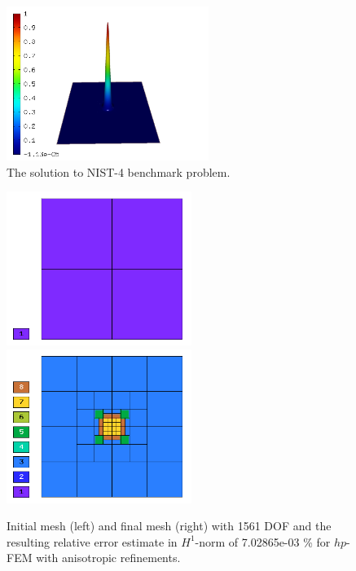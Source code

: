 \documentclass[12pt]{elsarticle}
\begin{document}
\begin{figure}[!ht]
\centering
\includegraphics[height=5cm]{nist/nist-4/solution.png}
\caption{The solution to NIST-4 benchmark problem.}
\label{fig:sln-nist04}
\end{figure}

\begin{figure}[!ht]
\centering
\includegraphics[height=5cm]{nist/nist-4/mesh_hp_aniso_init.png}\ \
\includegraphics[height=5cm]{nist/nist-4/mesh_hp_aniso.png}
\caption{Initial mesh (left) and final mesh (right) with 1561 DOF and the resulting relative error estimate in $H^1$-norm of 7.02865e-03 \% for $hp$-FEM with anisotropic refinements.}
\label{fig:nist-4-hp-aniso}
\end{figure}
\end{document}
